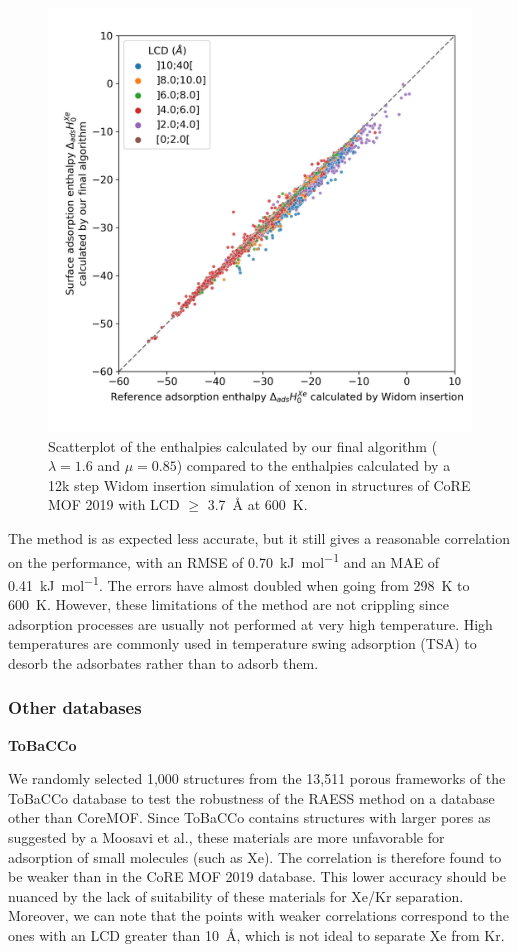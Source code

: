 \documentclass[main]{subfiles}
\begin{document}
\begin{figure}[ht]
\centering
  \includegraphics[width=0.5\linewidth]{figures/3-fastsim/H_Xe_widom_vs_H_Xe_surface_final_zoom_600K.jpeg}
  \caption{Scatterplot of the enthalpies calculated by our final algorithm ($\lambda=1.6$ and $\mu=0.85$) compared to the enthalpies calculated by a 12k step Widom insertion simulation of xenon in structures of CoRE MOF 2019 with LCD $\geq$ \SI{3.7}{\angstrom} at \SI{600}{\kelvin}. }
\end{figure}

The method is as expected less accurate, but it still gives a reasonable correlation on the performance, with an RMSE of \SI{0.70}{\kilo\joule\per\mole} and an MAE of \SI{0.41}{\kilo\joule\per\mole}. The errors have almost doubled when going from \SI{298}{\kelvin} to \SI{600}{\kelvin}. However, these limitations of the method are not crippling since adsorption processes are usually not performed at very high temperature. High temperatures are commonly used in temperature swing adsorption (TSA) to desorb the adsorbates rather than to adsorb them.

\subsubsection{Other databases}

\textbf{ToBaCCo}

We randomly selected 1,000 structures from the 13,511 porous frameworks of the ToBaCCo database to test the robustness of the RAESS method on a database other than CoreMOF. Since ToBaCCo contains structures with larger pores as suggested by a Moosavi et al., these materials are more unfavorable for adsorption of small molecules (such as Xe). The correlation is therefore found to be weaker than in the CoRE MOF 2019 database. This lower accuracy should be nuanced by the lack of suitability of these materials for Xe/Kr separation. Moreover, we can note that the points with weaker correlations correspond to the ones with an LCD greater than \SI{10}{\angstrom}, which is not ideal to separate Xe from Kr.
\end{document}
